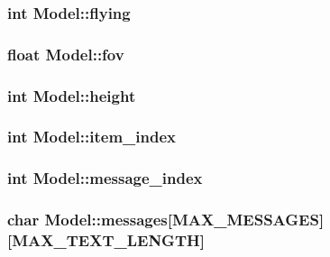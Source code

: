 \subsubsection[{\texorpdfstring{flying}{flying}}]{\setlength{\rightskip}{0pt plus 5cm}int Model\+::flying}\hypertarget{structModel_a5c6ca81f5d80886495091479812321f0}{}\label{structModel_a5c6ca81f5d80886495091479812321f0}
\subsubsection[{\texorpdfstring{fov}{fov}}]{\setlength{\rightskip}{0pt plus 5cm}float Model\+::fov}\hypertarget{structModel_ac42baa2c90d6e01bef3680719f59e905}{}\label{structModel_ac42baa2c90d6e01bef3680719f59e905}
\subsubsection[{\texorpdfstring{height}{height}}]{\setlength{\rightskip}{0pt plus 5cm}int Model\+::height}\hypertarget{structModel_a710c2d2f710d349e4a76c7d78570e70f}{}\label{structModel_a710c2d2f710d349e4a76c7d78570e70f}
\subsubsection[{\texorpdfstring{item\+\_\+index}{item_index}}]{\setlength{\rightskip}{0pt plus 5cm}int Model\+::item\+\_\+index}\hypertarget{structModel_a4ae976c019c23dff2d52f7fc89c6c0d0}{}\label{structModel_a4ae976c019c23dff2d52f7fc89c6c0d0}
\subsubsection[{\texorpdfstring{message\+\_\+index}{message_index}}]{\setlength{\rightskip}{0pt plus 5cm}int Model\+::message\+\_\+index}\hypertarget{structModel_a5026500a00cac3bb98dd3a2085802fa8}{}\label{structModel_a5026500a00cac3bb98dd3a2085802fa8}
\subsubsection[{\texorpdfstring{messages}{messages}}]{\setlength{\rightskip}{0pt plus 5cm}char Model\+::messages\mbox{[}{\bf M\+A\+X\+\_\+\+M\+E\+S\+S\+A\+G\+ES}\mbox{]}\mbox{[}{\bf M\+A\+X\+\_\+\+T\+E\+X\+T\+\_\+\+L\+E\+N\+G\+TH}\mbox{]}}\hypertarget{structModel_aa623ba15ac148da584c8cc1b7a76b7e9}{}\label{structModel_aa623ba15ac148da584c8cc1b7a76b7e9}
